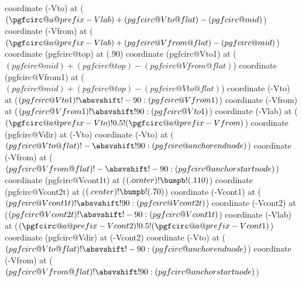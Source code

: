 {                coordinate (\pgfcirc@a@prefix-Vto) at ($(\pgfcirc@a@prefix-Vlab)+(pgfcirc@Vto@flat)-(pgfcirc@mid)$)
                coordinate (\pgfcirc@a@prefix-Vfrom) at ($(\pgfcirc@a@prefix-Vlab)+(pgfcirc@Vfrom@flat)-(pgfcirc@mid)$)
            \fi
        \fi
    \else
        \ifpgf@circuit@europeanvoltage
            \ifpgf@circuit@bipole@voltage@straight
                coordinate (pgfcirc@top) at (.90)
                coordinate (pgfcirc@Vto1) at ($(pgfcirc@mid)+(pgfcirc@top)-(pgfcirc@Vfrom@flat)$)
                coordinate (pgfcirc@Vfrom1) at ($(pgfcirc@mid)+(pgfcirc@top)-(pgfcirc@Vto@flat)$)
                coordinate (\pgfcirc@a@prefix-Vto)   at ($(pgfcirc@Vto1) ! \absvshift!-90 :  (pgfcirc@Vfrom1)$)
                coordinate (\pgfcirc@a@prefix-Vfrom) at ($(pgfcirc@Vfrom1) ! \absvshift!90 :  (pgfcirc@Vto1)$)
                coordinate (\pgfcirc@a@prefix-Vlab) at ($(\pgfcirc@a@prefix-Vto)!0.5!(\pgfcirc@a@prefix-Vfrom) $)
                coordinate (pgfcirc@Vdir) at (\pgfcirc@a@prefix-Vto)
            \else
                coordinate (\pgfcirc@a@prefix-Vto) at ($(pgfcirc@Vto@flat) ! -\absvshift!90 :  (pgfcirc@anchorendnode)$)
                coordinate (\pgfcirc@a@prefix-Vfrom) at ($(pgfcirc@Vfrom@flat) ! -\absvshift!-90 :  (pgfcirc@anchorstartnode)$)
                coordinate (pgfcirc@Vcont1t) at ($(\ctikzvalof{bipole/name}.center) ! \bumpb ! (\ctikzvalof{bipole/name}.110)$)
                coordinate (pgfcirc@Vcont2t) at ($(\ctikzvalof{bipole/name}.center) ! \bumpb ! (\ctikzvalof{bipole/name}.70)$)
                coordinate (\pgfcirc@a@prefix-Vcont1) at ($(pgfcirc@Vcont1t) ! \absvshift!90 : (pgfcirc@Vcont2t)$)
                coordinate (\pgfcirc@a@prefix-Vcont2) at ($(pgfcirc@Vcont2t) ! \absvshift!-90 : (pgfcirc@Vcont1t)$)
                coordinate (\pgfcirc@a@prefix-Vlab) at ($(\pgfcirc@a@prefix-Vcont2)!0.5!(\pgfcirc@a@prefix-Vcont1)$)
                coordinate (pgfcirc@Vdir) at (\pgfcirc@a@prefix-Vcont2)
            \fi
        \else
            coordinate (\pgfcirc@a@prefix-Vto) at ($(pgfcirc@Vto@flat) ! \absvshift!-90 :  (pgfcirc@anchorendnode)$)
            coordinate (\pgfcirc@a@prefix-Vfrom) at ($(pgfcirc@Vfrom@flat) ! \absvshift!90 :  (pgfcirc@anchorstartnode)$)
}
